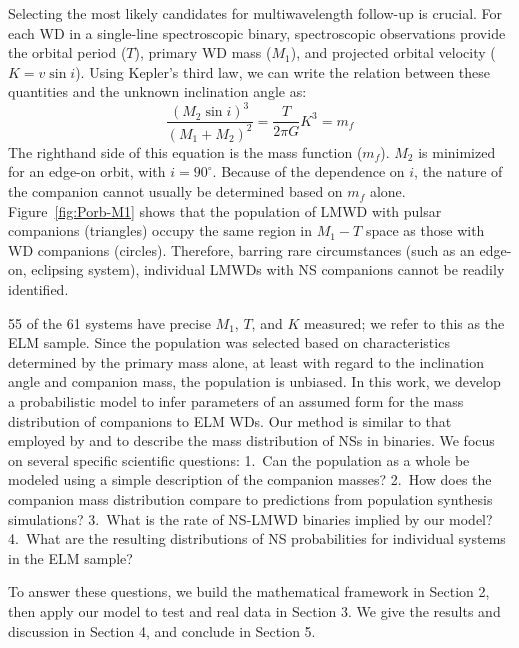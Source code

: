\documentclass[apjl]{emulateapj}
\newcommand{\degree}{^{\circ}}
\newcommand{\period}{T}
\newcommand{\mf}{m_f}
\begin{document}
Selecting the most likely candidates for multiwavelength follow-up is crucial. For each WD in a single-line spectroscopic binary, spectroscopic observations provide the orbital period ($\period$), primary WD mass ($M_1$), and projected orbital velocity ($K=v \sin i$). Using Kepler's third law, we can write the relation between these quantities and the unknown inclination angle as:
\begin{equation}
	\frac{(M_2 \sin i)^3}{\left(M_1+M_2\right)^2} = \frac{\period}{2\pi G} K^3 = \mf \label{eq:massfunc}
\end{equation}
The righthand side of this equation is the mass function ($\mf$). $M_2$ is minimized for an edge-on orbit, with $i = 90\degree$. Because of the dependence on $i$, the nature of the companion cannot usually be determined based on $\mf$ alone. Figure~\ref{fig:Porb-M1} shows that the population of LMWD with pulsar companions (triangles) occupy the same region in $M_1 - \period$ space as those with WD companions (circles). Therefore, barring rare circumstances (such as an edge-on, eclipsing system), individual LMWDs with NS companions cannot be readily identified.


55 of the 61 systems have precise $M_1$, $\period$, and $K$ measured; we refer to this as the ELM sample. Since the population was selected based on characteristics determined by the primary mass alone, at least with regard to the inclination angle and companion mass, the population is unbiased. In this work, we develop a probabilistic model to infer parameters of an assumed form for the mass distribution of companions to ELM WDs. Our method is similar to that employed by \citet{ozel12} and \citet{kiziltan13} to describe the mass distribution of NSs in binaries. We focus on several specific scientific questions: 1.\ Can the population as a whole be modeled using a simple description of the companion masses? 2.\ How does the companion mass distribution compare to predictions from population synthesis simulations?  3.\ What is the rate of NS-LMWD binaries implied by our model? 4.\ What are the resulting distributions of NS probabilities for individual systems in the ELM sample? 


To answer these questions, we build the mathematical framework in Section 2, then apply our model to test and real data in Section 3. We give the results and discussion in Section 4, and conclude in Section 5.
\end{document}
